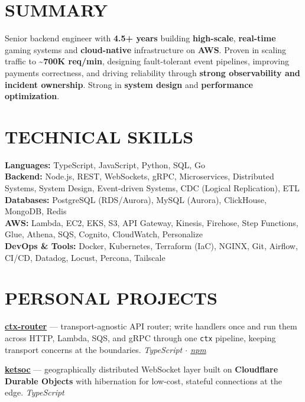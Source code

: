 \documentclass[a4paper,10pt]{article}
\begin{document}
\begin{minipage}[t]{0.37\textwidth}

\section*{SUMMARY}
Senior backend engineer with \textbf{4.5+ years} building \textbf{high-scale}, \textbf{real-time} gaming systems and \textbf{cloud-native} infrastructure on \textbf{AWS}. Proven in scaling traffic to \textbf{\textasciitilde{}700K req/min}, designing fault-tolerant event pipelines, improving payments correctness, and driving reliability through \textbf{strong observability and incident ownership}. Strong in \textbf{system design} and \textbf{performance optimization}.

\section*{TECHNICAL SKILLS}
\textbf{Languages:} TypeScript, JavaScript, Python, SQL, Go\\[2pt]
\textbf{Backend:} Node.js, REST, WebSockets, gRPC, Microservices, Distributed Systems, System Design, Event-driven Systems, CDC (Logical Replication), ETL\\[2pt]
\textbf{Databases:} PostgreSQL (RDS/Aurora), MySQL (Aurora), ClickHouse, MongoDB, Redis\\[2pt]
\textbf{AWS:} Lambda, EC2, EKS, S3, API Gateway, Kinesis, Firehose, Step Functions, Glue, Athena, SQS, Cognito, CloudWatch, Personalize\\[2pt]
\textbf{DevOps \& Tools:} Docker, Kubernetes, Terraform (IaC), NGINX, Git, Airflow, CI/CD, Datadog, Locust, Percona, Tailscale

\section*{PERSONAL PROJECTS}
\href{https://github.com/NeuronEnix/ctx-router}{\textbf{ctx-router}} --- transport-agnostic API router; write handlers once and run them across HTTP, Lambda, SQS, and gRPC through one \texttt{ctx} pipeline, keeping transport concerns at the boundaries. \textit{TypeScript $\cdot$ \href{https://www.npmjs.com/package/ctx-router}{npm}}

\href{https://github.com/NeuronEnix/ketsoc}{\textbf{ketsoc}} --- geographically distributed WebSocket layer built on \textbf{Cloudflare Durable Objects} with hibernation for low-cost, stateful connections at the edge. \textit{TypeScript}


\end{minipage}
\end{document}
